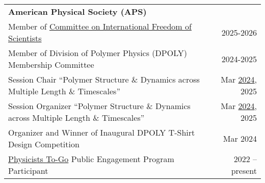 \documentclass[letterpaper,11pt]{article}
\begin{document}
\begin{longtable}{@{}p{}r@{}}
  \multicolumn{2}{l}{\hspace{-3mm} \bf{American Physical Society (APS)}}                                                                                                                                                                                                                               \\
  \hspace{3mm} \small Member of \href{https://www.aps.org/about/governance/committees/cifs}{Committee on International Freedom of Scientists}                                                                            & 2025-2026                                                                   \\
  \hspace{3mm} \small Member of Division of Polymer Physics (DPOLY) Membership Committee                                                                                                                                 & 2024-2025                                                                   \\
  \hspace{3mm} \small Session Chair ``Polymer Structure \& Dynamics across Multiple Length \& Timescales''                                                                                                               & Mar \href{https://meetings.aps.org/Meeting/MAR24/Session/Y32}{2024}, 2025   \\
  \hspace{3mm} \small Session Organizer ``Polymer Structure \& Dynamics across Multiple Length \& Timescales''                                                                                                           & Mar \href{https://meetings.aps.org/Meeting/MAR24/Session/Y32}{2024}, 2025   \\
  \hspace{3mm} \small Organizer and Winner of Inaugural DPOLY T-Shirt Design Competition                                                                                                                                 & Mar 2024                                                                    \\
  \hspace{3mm} \small \href{https://www.aps.org/programs/outreach/physiciststogo.cfm}{Physicists To-Go} Public Engagement Program Participant                                                                            & 2022 -- present                                                             \\

\end{longtable}
\end{document}
